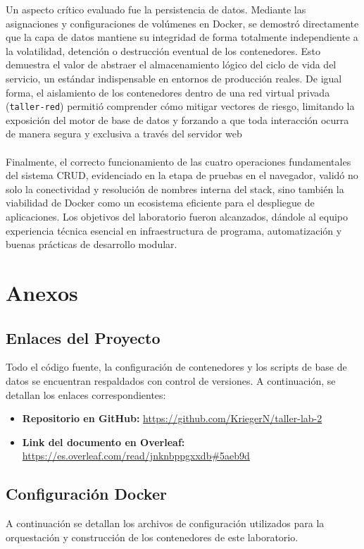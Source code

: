 Un aspecto crítico evaluado fue la persistencia de datos. Mediante las asignaciones y configuraciones de volúmenes en Docker, se demostró directamente que la capa de datos mantiene su integridad de forma totalmente independiente a la volatilidad, detención o destrucción eventual de los contenedores. Esto demuestra el valor de abstraer el almacenamiento lógico del ciclo de vida del servicio, un estándar indispensable en entornos de producción reales. De igual forma, el aislamiento de los contenedores dentro de una red virtual privada (\texttt{taller-red}) permitió comprender cómo mitigar vectores de riesgo, limitando la exposición del motor de base de datos y forzando a que toda interacción ocurra de manera segura y exclusiva a través del servidor web\\
\\
Finalmente, el correcto funcionamiento de las cuatro operaciones fundamentales del sistema CRUD, evidenciado en la etapa de pruebas en el navegador, validó no solo la conectividad y resolución de nombres interna del stack, sino también la viabilidad de Docker como un ecosistema eficiente para el despliegue de aplicaciones. Los objetivos del laboratorio fueron alcanzados, dándole al equipo experiencia técnica esencial en infraestructura de programa, automatización y buenas prácticas de desarrollo modular.

\chapter{Anexos}
\section{Enlaces del Proyecto}
Todo el código fuente, la configuración de contenedores y los scripts de base de datos se encuentran respaldados con control de versiones. A continuación, se detallan los enlaces correspondientes:

\begin{itemize}
    \item \textbf{Repositorio en GitHub:} \url{https://github.com/KriegerN/taller-lab-2}
    \item \textbf{Link del documento en Overleaf:} \url{https://es.overleaf.com/read/jnknbppgxxdb#5aeb9d}
\end{itemize}

\section{Configuración Docker}
A continuación se detallan los archivos de configuración utilizados para la orquestación y construcción de los contenedores de este laboratorio.

